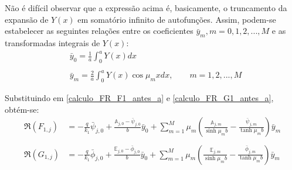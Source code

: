 Não é difícil observar que a expressão acima é, basicamente, o truncamento da expansão de $Y(x)$ em somatório infinito de autofunções. Assim, podem-se estabelecer as seguintes relações entre os coeficientes $\bar{y}_m, m=0,1,2,...,M$ e as transformadas integrais de $Y(x)$:
\begin{align}
& \bar{y}_0 = \frac{1}{a}\int_0^a Y(x) dx \\ \nonumber \\
& \bar{y}_m = \frac{2}{a}\int_0^a Y(x) \cos\mu_m x dx, \qquad m = 1, 2, ..., M
\end{align}

Substituindo em \eqref{calculo_FR_F1_antes_a} e \eqref{calculo_FR_G1_antes_a}, obtém-se:
\begin{align}
\Re(F_{1,j})
& =
-\frac{q}{k_1}\bar{\psi}_{j,0} + \frac{\mathbb{A}_{j,0} - \bar{\psi}_{j,0}}{b} \bar{y}_0 + \sum_{m=1}^M \mu_m \left(\frac{\mathbb{A}_{j,m}}{\sinh\mu_m b} - \frac{\bar{\psi}_{j, m}}{\tanh\mu_m b}\right)\bar{y}_m
\label{calculo_FR_F1_antes_b} \\ \nonumber \\
\Re(G_{1,j})
& =
-\frac{q}{k_1}\bar{\phi}_{j,0} + \frac{\mathbb{E}_{j,0} - \bar{\phi}_{j,0}}{b} \bar{y}_0 + \sum_{m=1}^M \mu_m \left(\frac{\mathbb{E}_{j,m}}{\sinh\mu_m b} - \frac{\bar{\phi}_{j, m}}{\tanh\mu_m b}\right)\bar{y}_m
\label{calculo_FR_G1_antes_b}
\end{align}

